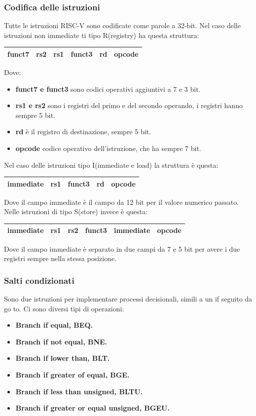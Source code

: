 \documentclass{article}
\begin{document}
\subsubsection{Codifica delle istruzioni}
Tutte le istruzioni RISC-V sono codificate come parole a 32-bit.
Nel caso delle istruzioni non immediate ti tipo R(registry) ha questa struttura:
\begin{center}
\begin{tabular}{|c|c|c|c|c|c|}
    \hline
    funct7 & rs2 & rs1 & funct3 & rd & opcode \\
    \hline
\end{tabular}
\end{center}
Dove: 
\begin{itemize}
    \item \textbf{funct7 e funct3} sono codici operativi aggiuntivi a 7 e 3 bit.
    \item \textbf{rs1 e rs2} sono i registri del primo e del secondo operando, i registri hanno sempre 5 bit.
    \item \textbf{rd} è il registro di destinazione, sempre 5 bit.
    \item \textbf{opcode} codice operativo dell'istruzione, che ha sempre 7 bit.
\end{itemize}
Nel caso delle istruzioni tipo I(immediate e load) la struttura è questa:
\begin{center}
\begin{tabular}{|c|c|c|c|c|}
    \hline
    immediate & rs1 & funct3 & rd & opcode \\
    \hline
\end{tabular}
\end{center}
Dove il campo immediate è il campo da 12 bit per il valore numerico passato.
Nelle istruzioni di tipo S(store) invece è questa:
\begin{center}
\begin{tabular}{|c|c|c|c|c|c|}
    \hline
    immediate & rs1 & rs2 & funct3 & immediate & opcode \\
    \hline
\end{tabular}
\end{center}
Dove il campo immediate è separato in due campi da 7 e 5 bit per avere i due registri sempre nella stessa posizione.

\subsubsection{Salti condizionati}
Sono due istruzioni per implementare processi decisionali, simili a un if seguito da go to. Ci sono diversi tipi di operazioni:
\begin{itemize}
    \item \textbf{Branch if equal, BEQ.}
    \item \textbf{Branch if not equal, BNE.}
    \item \textbf{Branch if lower than, BLT.}
    \item \textbf{Branch if greater of equal, BGE.}
    \item \textbf{Branch if less than unsigned, BLTU.}
    \item \textbf{Branch if greater or equal unsigned, BGEU.}
\end{itemize}
\end{document}
